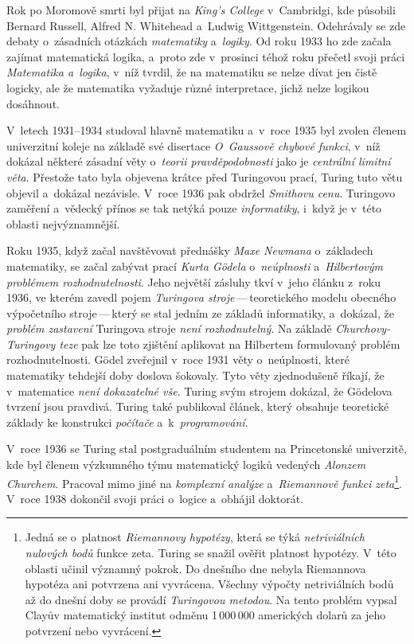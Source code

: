 \documentclass[a4paper, 11pt]{article}
\begin{document}
Rok po Moromově smrti byl přijat na \emph{King's College} v~Cambridgi, kde
působili Bernard Russell, Alfred N. Whitehead a~Ludwig Wittgenstein.
Odehrávaly se zde debaty o~zásadních otázkách \emph{matematiky}
a~\emph{logiky}. Od roku 1933 ho zde začala zajímat matematická logika,
a~proto zde v~prosinci téhož roku přečetl svoji práci \emph{Matematika
a~logika}, v~níž tvrdil, že na matematiku se nelze dívat jen čistě logicky,
ale že matematika vyžaduje různé interpretace, jichž nelze logikou dosáhnout.

V~letech 1931--1934 studoval hlavně matematiku a~v~roce 1935 byl zvolen
členem univerzitní koleje na základě své disertace \emph{O~Gaussově
chybové funkci}, v~níž dokázal některé zásadní věty o~\emph{teorii
pravděpodobnosti} jako je \emph{centrální limitní věta}. Přestože tato
byla objevena krátce před Turingovou prací, Turing tuto větu
objevil a~dokázal nezávisle. V~roce 1936 pak obdržel \emph{Smithovu cenu}.
Turingovo zaměření a~vědecký přínos se tak netýká pouze \emph{informatiky},
i~když je v~této oblasti nejvýznamnější.

Roku 1935, když začal navštěvovat přednášky \emph{Maxe Newmana} o~základech
matematiky, se začal zabývat prací \emph{Kurta Gödela} o~\emph{neúplnosti}
a~\emph{Hilbertovým problémem rozhodnutelnosti}. Jeho největší zásluhy
tkví v~jeho článku z~roku 1936, ve kterém zavedl pojem \emph{Turingova
stroje}\,---\,teoretického modelu obecného výpočetního stroje\,---\,který
se stal jedním ze základů informatiky, a~dokázal, že \emph{problém zastavení}
Turingova stroje \emph{není rozhodnutelný}. Na základě
\emph{Churchovy-Turingovy teze} pak lze toto zjištění aplikovat na
Hilbertem formulovaný problém rozhodnutelnosti. Gödel zveřejnil v~roce 1931
věty o~neúplnosti, které matematiky tehdejší doby doslova šokovaly. Tyto
věty zjednodušeně říkají, že v~matematice \emph{není dokazatelné vše}.
Turing svým strojem dokázal, že Gödelova tvrzení jsou pravdivá. Turing také
publikoval článek, který obsahuje teoretické základy ke konstrukci
\emph{počítače} a~k~\emph{programování}.

V~roce 1936 se Turing stal postgraduálním studentem na Princetonské
univerzitě, kde byl členem výzkumného týmu matematický logiků vedených
\emph{Alonzem Churchem}. Pracoval mimo jiné na \emph{komplexní analýze}
a~\emph{Riemannově funkci zeta}\footnote{Jedná se o~platnost \emph{Riemannovy
hypotézy}, která se týká \emph{netriviálních nulových bodů} funkce zeta.
Turing se snažil ověřit platnost hypotézy. V~této oblasti učinil významný
pokrok. Do dnešního dne nebyla Riemannova hypotéza ani potvrzena ani
vyvrácena. Všechny výpočty netriviálních bodů až do dnešní doby se provádí
\emph{Turingovou metodou}. Na tento problém vypsal Clayův matematický institut
odměnu 1\,000\,000 amerických dolarů za jeho potvrzení nebo vyvrácení.}.
V~roce 1938 dokončil svoji práci o~logice a~obhájil doktorát.
\end{document}
